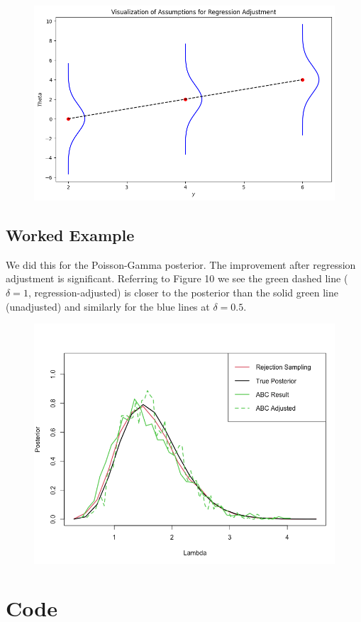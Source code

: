\documentclass{article}
\begin{document}
\begin{figure}
    \centering
    \includegraphics[width=1\linewidth]{overviews//ABC//figures/abc_asummp.png}
\end{figure}

\subsection{Worked Example}
We did this for the Poisson-Gamma posterior. The improvement after regression adjustment is significant. Referring to Figure 10 we see the green dashed line ( $\delta=1$, regression-adjusted) is closer to the posterior than the solid green line (unadjusted) and similarly for the blue lines at $\delta=0.5$.

\begin{figure}
    \centering
    \includegraphics[width=1\linewidth]{overviews//ABC//figures/abc-comps.png}
\end{figure}

\printbibliography


\newpage
\appendix
\section{Code}
\inputminted[linenos=true]{python}{code/abc_assump.py}
\inputminted[linenos=true]{R}{code/abc-comps.R}
\end{document}
